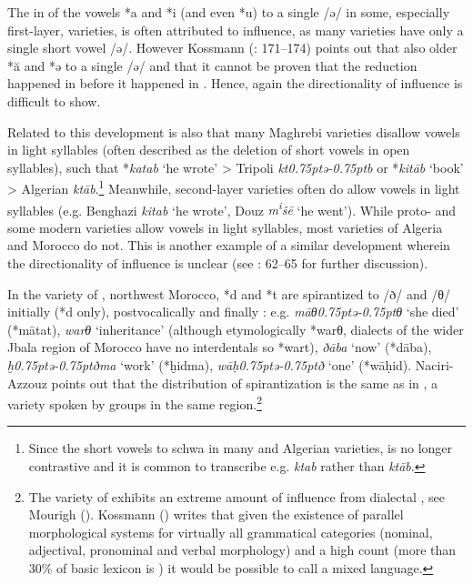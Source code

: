 \documentclass[output=paper]{langsci/langscibook}
\begin{document}
  The  in  of the vowels *{a} and *{i} (and even *{u}) to a single  /ǝ/ in some, especially first-layer, varieties, is often attributed to  influence, as many  varieties have only a single short vowel  /ǝ/. However Kossmann (\citeyear{Kossmann2013book}: 171–174) points out that  also  older *ă and *ǝ to a single  /ǝ/ and that it cannot be proven that the reduction happened in  before it happened in . Hence, again the directionality of influence is difficult to show.

  Related to this development is also that many Maghrebi varieties disallow vowels in light syllables (often described as the deletion of short vowels in open syllables), such that *\textit{katab} ‘he wrote’ > Tripoli \textit{kt\kern 0.75ptǝ\kern -0.75ptb} or *\textit{kitāb} ‘book’ > Algerian \textit{ktāb}.\footnote{Since the short vowels  to schwa in many  and Algerian varieties,  is no longer contrastive and it is common to transcribe e.g. \textit{ktab} rather than \textit{ktāb}.} Meanwhile, second-layer varieties often do allow vowels in light syllables (e.g. Benghazi \textit{kitab} ‘he wrote’, Douz \textit{m\textsuperscript{i}}\textit{šē} ‘he went’). While proto- and some modern varieties allow vowels in light syllables, most  varieties of Algeria and Morocco do not. This is another example of a similar development wherein the directionality of influence is unclear (see \citealt{Souag2017syllable}: 62–65 for further discussion).

  In the  variety of , northwest Morocco, *d and *t are spirantized to /ð/ and /θ/ initially (*d only), postvocalically and finally \citep{Naciri-Azzouz2016}: e.g. \textit{māθ\kern 0.75ptǝ\kern -0.75ptθ} `she died' (*mātat), \textit{warθ} `inheritance' (although etymologically *warθ, dialects of the wider Jbala region of Morocco have no interdentals so *wart), \textit{ðāba} `now' (*dāba), \textit{ḫ\kern 0.75ptǝ\kern -0.75ptðma} `work' (*ḫidma), \textit{wāḥ\kern 0.75ptǝ\kern -0.75ptð} `one' (*wāḥid). Naciri-Azzouz points out that the distribution of spirantization is the same as in  , a variety spoken by groups in the same region.\footnote{The  variety of  exhibits an extreme amount of influence from dialectal , see Mourigh (\citeyear{Mourigh2015}). Kossmann (\citeyear[431]{Kossmann2013book}) writes that given the existence of parallel morphological systems for virtually all grammatical categories (nominal, adjectival, pronominal and verbal morphology) and a high  count (more than 30\% of basic lexicon is ) it would be possible to call   a mixed language.}
\end{document}
